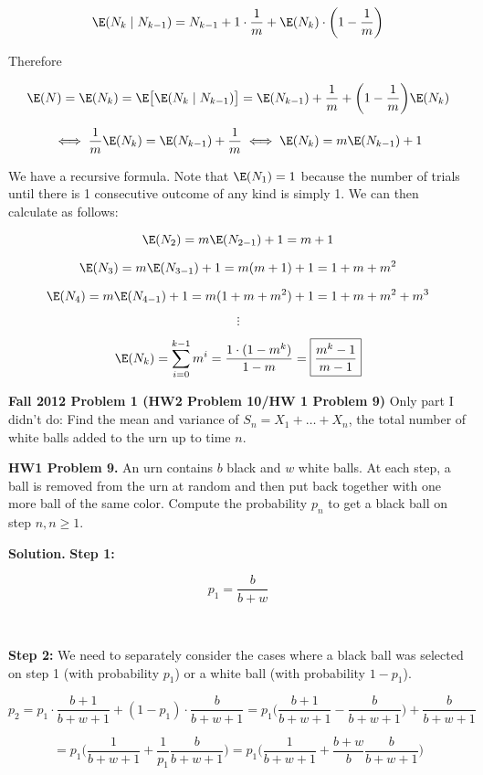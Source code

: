 \begin{enumerate}[(a)]
\[
\E(N_k \mid N_{k-1} ) = N_{k-1} + 1 \cdot \frac{1}{m} + \E(N_k) \cdot \bigg(1 - \frac{1}{m} \bigg)
\]

Therefore

\[
\E(N) = \E(N_k) = \E \big[ \E(N_k \mid N_{k-1} )\big] = \E(N_{k-1}) + \frac{1}{m} + \bigg(1 - \frac{1}{m} \bigg) \E(N_k)
\]

\[
\iff \frac{1}{m} \E(N_k) = \E(N_{k-1}) + \frac{1}{m} \iff \E(N_k) = m \E(N_{k-1}) + 1
\]

We have a recursive formula. Note that \(\E(N_1) = 1\) because the number of trials until there is 1 consecutive outcome of any kind is simply 1. We can then calculate as follows:

\[
\E(N_2) = m \E(N_{2-1}) + 1 = m + 1
\]

\[
\E(N_3) = m \E(N_{3-1}) + 1 = m(m + 1) + 1 = 1 + m + m^2
\]

\[
\E(N_4) = m \E(N_{4-1}) + 1 = m(1 + m + m^2) + 1 = 1 + m + m^2 + m^3
\]

\[
\vdots
\]

\[
\E(N_k) = \sum_{i=0}^{k-1} m^i = \frac{1 \cdot (1-m^{k})}{1 - m} = \boxed{\frac{m^k -1}{m-1}}
\]


\end{enumerate}


\textbf{Fall 2012 Problem 1 (HW2 Problem 10/HW 1 Problem 9)} Only part I didn't do: Find the mean and variance of \(S_n = X_1 + \ldots + X_n\), the total number of white balls added to the urn up to time \(n\).

\textbf{HW1 Problem 9.} An urn contains \(b\) black and \(w\) white balls. At each step, a ball is removed from the urn at random and then put back together with one more ball of the same color. Compute the probability \(p_n\) to get a black ball on step \(n, n \geq 1\).

\textbf{Solution.} \textbf{Step 1:}

\[
p_1 = \frac{b}{b+w}
\]

\

\textbf{Step 2:} We need to separately consider the cases where a black ball was selected on step 1 (with probability \(p_1\)) or a white ball (with probability \(1 - p_1\)).

\[
p_2 = p_1 \cdot \frac{b + 1}{b + w + 1} + (1 - p_1) \cdot \frac{b}{b + w + 1} = p_1 \bigg(\frac{b + 1}{b + w + 1} -  \frac{b}{b + w + 1} \bigg) + \frac{b}{b + w + 1}
\]

\[
= p_1\bigg( \frac{1}{b + w + 1} + \frac{1}{p_1}\frac{b}{b + w + 1} \bigg) = p_1\bigg( \frac{1}{b + w + 1} + \frac{b + w}{b}\frac{b}{b + w + 1} \bigg) 
\]

